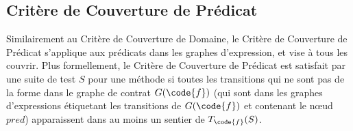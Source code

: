 \subsection{Critère de Couverture de Prédicat}

Similairement au Critère de Couverture de Domaine, le Critère de Couverture de
Prédicat s'applique aux prédicats dans les graphes d'expression, et vise à tous
les couvrir. Plus formellement, le Critère de Couverture de Prédicat est
satisfait par une suite de test $S$ pour une méthode  si toutes les
transitions qui ne sont pas de la forme  dans le graphe de
contrat $G(\code{f})$ (qui sont dans les graphes d'expressions étiquetant les
transitions de $G(\code{f})$ et contenant le nœud $\mathit{pred}$) apparaissent
dans au moins un sentier de $T_\code{f}(S)$.

